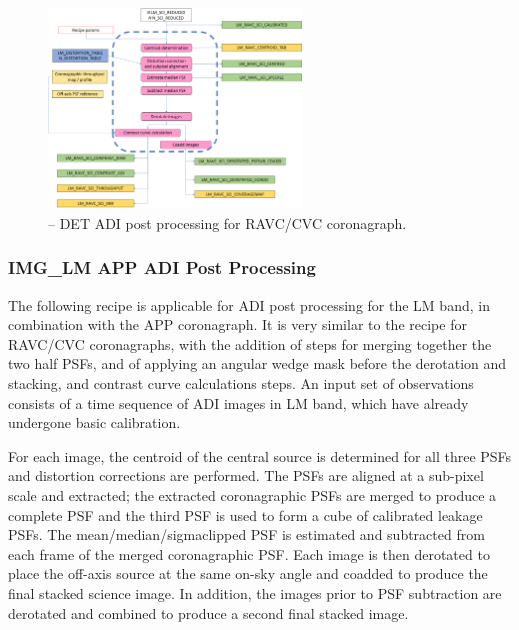 \begin{figure}[hb]
  \centering
  \includegraphics[width=0.6\textwidth]{./figures/metis_lm_adi_ravc}
  \caption[Recipe: ]{\hyperref[rec:metis_img_adi_cgrph]{} -- DET ADI post processing for RAVC/CVC coronagraph.
    }
  \label{fig:metis_det_adi_ravc}
\end{figure}




\subsubsection{IMG\_LM APP ADI Post Processing}
\label{sssec:adi_img_app}


The following recipe is applicable for ADI post processing for the LM
band, in combination with the APP coronagraph. It is very
similar to the recipe for RAVC/CVC coronagraphs, with the
addition of steps for merging together the two half PSFs, and of
applying an angular wedge mask before the derotation and stacking, and
contrast curve calculations steps. An input set of observations
consists of a time sequence of ADI images in LM band, which have
already undergone basic calibration.

For each image, the centroid of the central source is determined for
all three PSFs and distortion corrections are performed. The PSFs are
aligned at a sub-pixel scale and extracted; the extracted
coronagraphic PSFs are merged to produce a complete PSF and the third
PSF is used to form a cube of calibrated leakage PSFs.  The
mean/median/sigmaclipped PSF is estimated and subtracted from each
frame of the merged coronagraphic PSF. Each image is then derotated to
place the off-axis source at the same on-sky angle and coadded to
produce the final stacked science image. In addition, the images prior
to PSF subtraction are derotated and combined to produce a second
final stacked image.

